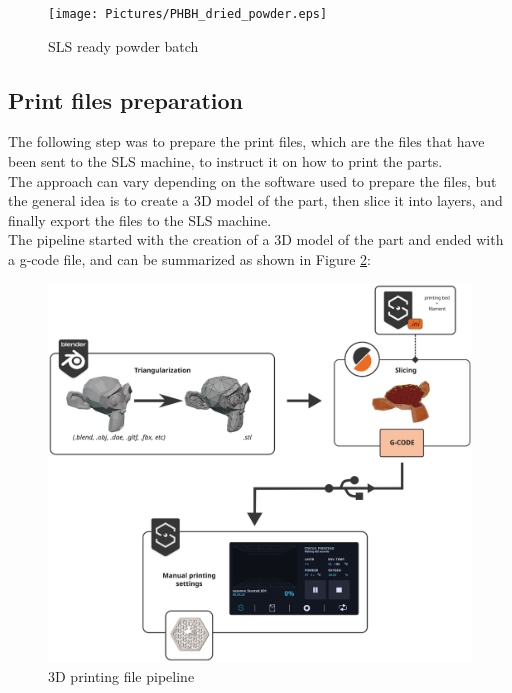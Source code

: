 \documentclass{article}
\begin{document}
                  \begin{figure}[ht]
                      \centering
                      \texttt{[image: Pictures/PHBH\_dried\_powder.eps]}
                      \caption{SLS ready powder batch}
                      \label{fig:PHBH_collected_powder}
                      
                  \end{figure}
  
          \subsection{Print files preparation\label{Print_files_preparation}}
  
          The following step was to prepare the print files, which are the files that have been sent to the SLS machine, 
          to instruct it on how to print the parts. \\
  
          The approach can vary depending on the software used to prepare the files, but the general idea is to 
          create a 3D model of the part, then slice it into layers, and finally export the files to the SLS machine. \\
  
          The pipeline started with the creation of a 3D model of the part and ended with a g-code file, and can 
          be summarized as shown in Figure \ref{fig:3dprint_file_pipeline_scheme}: 
          
                  \begin{figure}[ht]
                      \centering 
                      \includegraphics[width=\textwidth]{Pictures/3dprint_file_pipeline_scheme.eps}
                      \caption{3D printing file pipeline}
                      \label{fig:3dprint_file_pipeline_scheme}
                  \end{figure}
  
\end{document}
